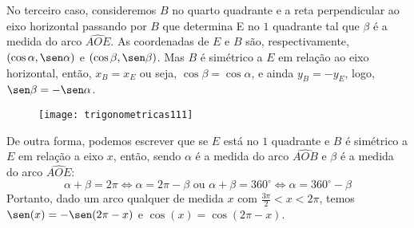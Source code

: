 No terceiro caso, consideremos $B$ no quarto quadrante e a reta perpendicular ao eixo horizontal passando por $B$ que determina E no $1$ quadrante tal que $\beta$ é a medida do arco $\widehat{AOE}$. As coordenadas de $E$ e $B$ são, respectivamente, $(\cos\alpha, \sen\alpha)$ e $(\cos\beta, \sen\beta)$. Mas $B$ é simétrico a $E$ em relação ao eixo horizontal, então, $x_B = x_E$  ou seja, $\cos\beta = \cos\alpha$, e ainda $y_B= - y_E$, logo, $\sen\beta = - \sen\alpha$.

\begin{figure}[H]
\centering

\texttt{[image: trigonometricas111]}
\end{figure}

De outra forma, podemos escrever que se $E$ está no $1$ quadrante e $B$ é simétrico a $E$ em relação a eixo $x$, então, sendo $\alpha$ é a medida do arco $\widehat{AOB}$ e $\beta$ é a medida do arco $\widehat{AOE}$:
\begin{equation*}
\alpha+\beta=2\pi\iff\alpha=2\pi-\beta\text{ ou }\alpha+\beta=360^{\circ}\iff\alpha=360^{\circ}-\beta
\end{equation*}
Portanto, dado um arco qualquer de medida $x$ com  $\frac{3\pi}{2}<x<2\pi$, temos $\sen(x)= -\sen(2\pi-x)$  e $\cos(x)= \cos(2\pi-x)$.

